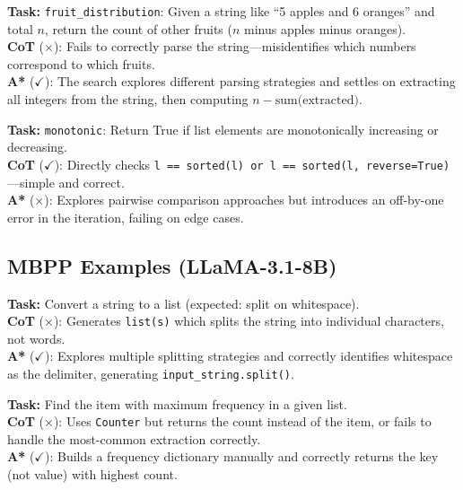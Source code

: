 \documentclass[11pt]{article}
\begin{document}
{{\begin{examplebox}[title=HumanEval/67 --- A* Correct{,} CoT Wrong]
\textbf{Task:} \texttt{fruit\_distribution}: Given a string like ``5 apples and 6 oranges'' and total $n$, return the count of other fruits ($n$ minus apples minus oranges).\\[4pt]
\textbf{CoT} ($\times$): Fails to correctly parse the string---misidentifies which numbers correspond to which fruits.\\[4pt]
\textbf{A*} ($\checkmark$): The search explores different parsing strategies and settles on extracting all integers from the string, then computing $n - \text{sum(extracted)}$.
\end{examplebox}

\begin{examplebox}[title=HumanEval/57 --- CoT Correct{,} A* Wrong]
\textbf{Task:} \texttt{monotonic}: Return True if list elements are monotonically increasing or decreasing.\\[4pt]
\textbf{CoT} ($\checkmark$): Directly checks \texttt{l == sorted(l) or l == sorted(l, reverse=True)}---simple and correct.\\[4pt]
\textbf{A*} ($\times$): Explores pairwise comparison approaches but introduces an off-by-one error in the iteration, failing on edge cases.
\end{examplebox}

\subsection{MBPP Examples (LLaMA-3.1-8B)}

\begin{examplebox}[title=MBPP/118 --- A* Correct{,} CoT Wrong]
\textbf{Task:} Convert a string to a list (expected: split on whitespace).\\[4pt]
\textbf{CoT} ($\times$): Generates \texttt{list(s)} which splits the string into individual characters, not words.\\[4pt]
\textbf{A*} ($\checkmark$): Explores multiple splitting strategies and correctly identifies whitespace as the delimiter, generating \texttt{input\_string.split()}.
\end{examplebox}

\begin{examplebox}[title=MBPP/130 --- A* Correct{,} CoT Wrong]
\textbf{Task:} Find the item with maximum frequency in a given list.\\[4pt]
\textbf{CoT} ($\times$): Uses \texttt{Counter} but returns the count instead of the item, or fails to handle the most-common extraction correctly.\\[4pt]
\textbf{A*} ($\checkmark$): Builds a frequency dictionary manually and correctly returns the key (not value) with highest count.
\end{examplebox}

}}
\end{document}
